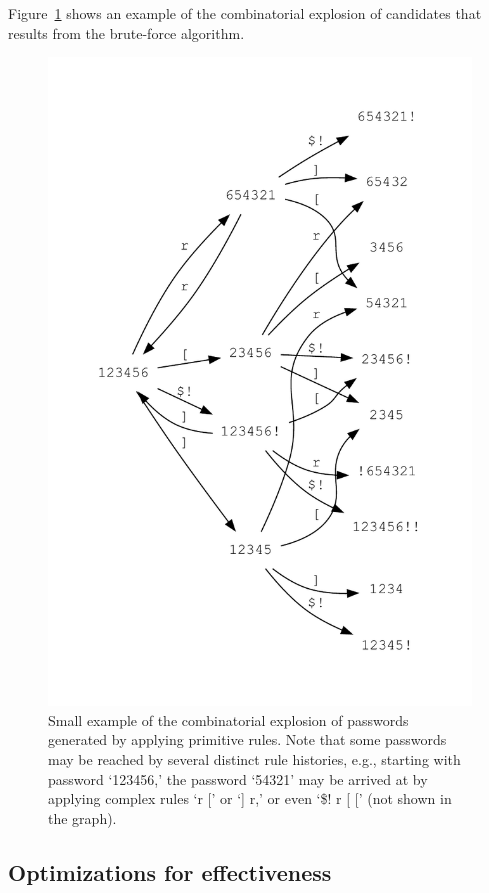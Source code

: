\documentclass[letterpaper,twocolumn,10pt]{article}
\begin{document}
Figure~\ref{fig:pwgen} shows an example of the combinatorial explosion of
candidates that results from the brute-force algorithm.

\begin{figure}[h!]
\includegraphics[width=\linewidth]{example-pw-rules.pdf}
\caption{Small example of the combinatorial explosion of passwords generated by
applying primitive rules. Note that some passwords may be reached by several
distinct rule histories, e.g., starting with password `123456,' the password
`54321' may be arrived at by applying complex rules `r [' or `] r,' or
even `\$! r [ [' (not shown in the graph).}
\label{fig:pwgen}
\end{figure}

\subsection{Optimizations for effectiveness}
\end{document}
